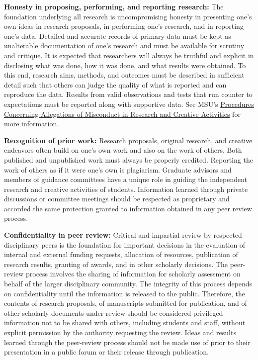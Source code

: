 \textbf{Honesty in proposing, performing, and reporting research:} The
foundation underlying all research is uncompromising honesty in
presenting one's own ideas in research proposals, in performing one's
research, and in reporting one's data. Detailed and accurate records
of primary data must be kept as unalterable documentation of one's
research and must be available for scrutiny and critique. It is
expected that researchers will always be truthful and explicit in
disclosing what was done, how it was done, and what results were
obtained. To this end, research aims, methods, and outcomes must be
described in sufficient detail such that others can judge the quality
of what is reported and can reproduce the data. Results from valid
observations and tests that run counter to expectations must be
reported along with supportive data.  See MSU's
\href{https://www.hr.msu.edu/documents/facacadhandbooks/facultyhandbook/misconductproc/}{Procedures
  Concerning Allegations of Misconduct in Research and Creative
  Activities} for more information.
 
\textbf{Recognition of prior work:} Research proposals, original
research, and creative endeavors often build on one's own work and
also on the work of others. Both published and unpublished work must
always be properly credited. Reporting the work of others as if it
were one's own is plagiarism. Graduate advisors and members of
guidance committees have a unique role in guiding the independent
research and creative activities of students. Information learned
through private discussions or committee meetings should be respected
as proprietary and accorded the same protection granted to information
obtained in any peer review process. 

\textbf{Confidentiality in peer review:} Critical and impartial review
by respected disciplinary peers is the foundation for important
decisions in the evaluation of internal and external funding requests,
allocation of resources, publication of research results, granting of
awards, and in other scholarly decisions. The peer-review process
involves the sharing of information for scholarly assessment on behalf
of the larger disciplinary community. The integrity of this process
depends on confidentiality until the information is released to the
public. Therefore, the contents of research proposals, of manuscripts
submitted for publication, and of other scholarly documents under
review should be considered privileged information not to be shared
with others, including students and staff, without explicit permission
by the authority requesting the review. Ideas and results learned
through the peer-review process should not be made use of prior to
their presentation in a public forum or their release through
publication. 

